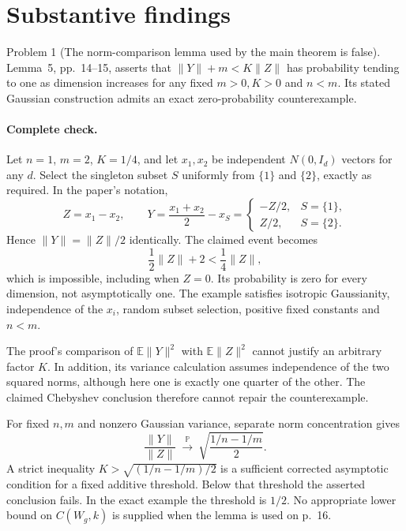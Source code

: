 \documentclass[10pt]{article}
\begin{document}
\section*{Substantive findings}
Problem 1 (The norm-comparison lemma used by the main theorem is false).  Lemma 5, pp. 14–15, asserts that \(\|Y\|+m<K\|Z\|\) has probability tending to one as dimension increases for any fixed \(m>0,K>0\) and \(n<m\). Its stated Gaussian construction admits an exact zero-probability counterexample.\par
\paragraph*{Complete check.}\mbox{}\par
Let \(n=1\), \(m=2\), \(K=1/4\), and let \(x_1,x_2\) be independent \(N(0,I_d)\) vectors for any \(d\). Select the singleton subset \(S\) uniformly from \(\{1\}\) and \(\{2\}\), exactly as required. In the paper’s notation, \[Z=x_1-x_2,\qquad
 Y=\frac{x_1+x_2}{2}-x_S=
 \begin{cases}-Z/2,&S=\{1\},\\ Z/2,&S=\{2\}.\end{cases}\] Hence \(\|Y\|=\|Z\|/2\) identically. The claimed event becomes \[\frac12\|Z\|+2<\frac14\|Z\|,\] which is impossible, including when \(Z=0\). Its probability is zero for every dimension, not asymptotically one. The example satisfies isotropic Gaussianity, independence of the \(x_i\), random subset selection, positive fixed constants and \(n<m\).\par
The proof’s comparison of \(\mathbb E\|Y\|^2\) with \(\mathbb E\|Z\|^2\) cannot justify an arbitrary factor \(K\). In addition, its variance calculation assumes independence of the two squared norms, although here one is exactly one quarter of the other. The claimed Chebyshev conclusion therefore cannot repair the counterexample.\par
For fixed \(n,m\) and nonzero Gaussian variance, separate norm concentration gives \[\frac{\|Y\|}{\|Z\|}
 \ \xrightarrow{\mathbb P}\
 \sqrt{\frac{1/n-1/m}{2}}.\] A strict inequality \(K>\sqrt{(1/n-1/m)/2}\) is a sufficient corrected asymptotic condition for a fixed additive threshold. Below that threshold the asserted conclusion fails. In the exact example the threshold is \(1/2\). No appropriate lower bound on \(C(W_g,k)\) is supplied when the lemma is used on p. 16.\par
\end{document}
